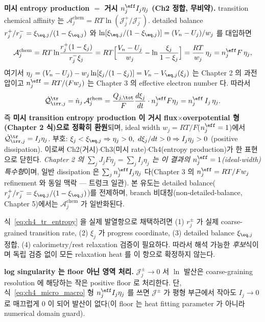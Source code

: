 \begin{verifybox}
\textbf{미시 entropy production $=$ 거시 $n_j^{\eff}I_j\eta_j$ (Ch2 정합, 무비약).} transition chemical
affinity 는 $\mathcal A_j^{\mathrm{chem}}=RT\ln(\mathcal J_j^+/\mathcal J_j^-)$. detailed balance
$r_j^+/r_j^-=\xi_{\eq,j}/(1-\xi_{\eq,j})$ 와 $\ln[\xi_{\eq,j}/(1-\xi_{\eq,j})]=(V_n-U_j)/w_j$ 를 대입하면
\begin{equation}
\mathcal A_j^{\mathrm{chem}}=RT\ln\!\frac{r_j^+(1-\xi_j)}{r_j^-\xi_j}
=RT\Big[\frac{V_n-U_j}{w_j}-\ln\frac{\xi_j}{1-\xi_j}\Big]
=\frac{RT}{w_j}\,\eta_j=n_j^{\eff}F\,\eta_j,
\label{eq:ch4_affinity_eta}
\end{equation}
여기서 $\eta_j=(V_n-U_j)-w_j\ln[\xi_j/(1-\xi_j)]=V_n-V_{\eq,j}(\xi_j)$ 는 Chapter 2 의 과전압이고
$n_j^{\eff}=RT/(Fw_j)$ 는 Chapter 3 의 effective electron number 다. 따라서
\begin{equation}
\dot{\mathcal Q}_{\irr,j}^{\tr}=\dot n_j\,\mathcal A_j^{\mathrm{chem}}
=\frac{Q_{j,\tot}}{F}\frac{d\xi_j}{dt}\cdot n_j^{\eff}F\eta_j
=n_j^{\eff}\,I_j\,\eta_j.
\label{eq:ch4_micro_macro}
\end{equation}
즉 \textbf{미시 transition entropy production 이 거시 flux$\times$overpotential 형(Chapter 2 식)으로 정확히
환원}되며, ideal width $w_j=RT/F$($n_j^{\eff}=1$)에서 $\dot{\mathcal Q}_{\irr,j}^{\tr}=I_j\eta_j$. 부호:
$\xi_j<\xi_{\eq,j}\Rightarrow\eta_j>0,\ d\xi_j/dt>0\Rightarrow I_j\eta_j>0$ (positive dissipation). 이로써
Ch2(거시)$\cdot$Ch3(미시 rate)$\cdot$Ch4(entropy production)가 한 표현으로 닫힌다.
\emph{Chapter 2 의 $\sum_jJ_jF\eta_j=\sum_jI_j\eta_j$ 는 이 결과의 $n_j^{\eff}=1$(ideal-width) 특수형}이며,
일반 dissipation 은 $\sum_j n_j^{\eff}I_j\eta_j$ 다(Chapter 3 의 $n_j^{\eff}=RT/Fw_j$ refinement 와 동일
맥락 — 트렁크 일관). 본 유도는 detailed balance($r_j^+/r_j^-=\xi_{\eq,j}/(1-\xi_{\eq,j})$)를 전제하며,
branch 비대칭(non-detailed-balance, Chapter 5)에서는 $\mathcal A_j^{\mathrm{chem}}$ 가 일반화된다.
\end{verifybox}

식~\eqref{eq:ch4_tr_entropy} 을 실제 발열항으로 채택하려면 (1) $r_j^\pm$ 가 실제 coarse-grained transition
rate, (2) $\xi_j$ 가 progress coordinate, (3) detailed balance $\xi_{\eq,j}$ 정합, (4) calorimetry/rest
relaxation 검증이 필요하다. 따라서 해석 가능한 \emph{후보}식이며 독립 검증 없이 모든 relaxation heat 를
이 항으로 확정하지 않는다.
\begin{boundbox}
\textbf{log singularity 는 floor 아닌 영역 처리.} $\mathcal J_j^\pm\to0$ 서 $\ln$ 발산은 coarse-graining
resolution 에 해당하는 작은 positive floor 로 처리한다. 단, 식~\eqref{eq:ch4_micro_macro} 형
$n_j^{\eff}I_j\eta_j$ 를 쓰면 $\mathcal J^\pm$ 가 평형 부근에서 작아도 $I_j\to0$ 로 매끄럽게 0 이 되어
발산이 없다(이 floor 는 heat fitting parameter 가 아니라 numerical domain guard).
\end{boundbox}

